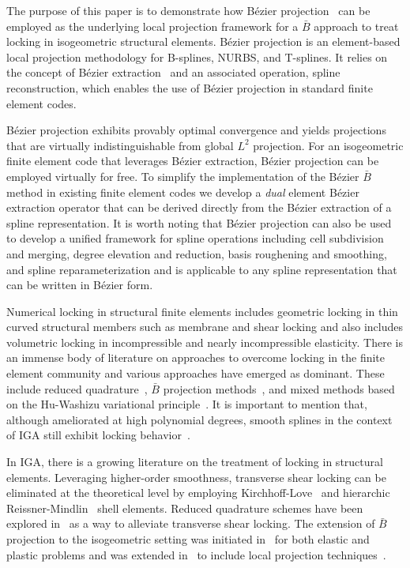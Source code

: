 \documentclass{article}
\newcommand{\Bezier}{{B\'{e}zier} }
\begin{document}
The purpose of this paper is to demonstrate how B\'{e}zier projection~\cite{thomas_bezier_2015} can be employed as the underlying local projection framework for a $\bar{B}$ approach to treat locking in isogeometric structural elements. B\'ezier projection is an element-based local projection methodology for B-splines, NURBS, and T-splines. It relies on the concept of B\'ezier extraction~\cite{borden_isogeometric_2011, scott_isogeometric_2011} and an associated operation, spline reconstruction, which enables the use of B\'ezier projection in standard finite element codes.

B\'ezier projection exhibits provably optimal convergence and yields
projections that are virtually indistinguishable from global $L^2$ projection. For an isogeometric finite element code that leverages B\'ezier extraction, B\'ezier projection can be employed virtually for free. To simplify the implementation of the \Bezier $\bar{B}$ method in existing finite element codes we develop a \textit{dual} element \Bezier extraction operator that can be derived directly from the \Bezier extraction of a spline representation. It is worth noting that B\'ezier projection can also be used to develop a unified framework for spline operations including cell subdivision and merging, degree elevation and reduction, basis roughening and smoothing, and spline reparameterization and is applicable to any spline representation that can be written in B\'ezier form.

Numerical locking in structural finite elements includes geometric locking in thin curved structural members such as membrane and shear locking and also includes volumetric locking in incompressible and nearly incompressible elasticity. There is an immense body of literature on approaches to overcome locking in the finite element community and various approaches have emerged as dominant. These include reduced quadrature~\cite{malkus_mixed_1978,zienkiewicz_reduced_1971}, $\bar{B}$ projection methods~\cite{nagtegaal_numerically_1974,hughes_generalization_1980}, and mixed methods based on the Hu-Washizu variational principle~\cite{dolbow_volumetric_1999,kasper_mixed-enhanced_2000,hughes_variational_1986}. It is important to mention that, although ameliorated at high polynomial degrees, smooth splines in the context of IGA still exhibit locking behavior~\cite{echter_numerical_2010, bouclier_locking_2012}.

In IGA, there is a growing literature on the treatment of locking in structural elements. Leveraging higher-order smoothness, transverse shear locking can be eliminated at the theoretical level by employing Kirchhoff-Love~\cite{kiendl_isogeometric_2009, kiendl_isogeometric_2015} and hierarchic Reissner-Mindlin~\cite{oesterle_hierarchic_2017, oesterle_shear_2016,echter_hierarchic_2013} shell elements. Reduced quadrature schemes have been explored in~\cite{adam_improved_2014, adam_improved_2015, adam_selective_2015} as a way to alleviate transverse shear locking. The extension of $\bar{B}$ projection to the isogeometric setting was initiated in~\cite{elguedj:hal-00457010} for both elastic and plastic problems and was extended in~\cite{bouclier_efficient_2013} to include local projection techniques~\cite{mitchell_method_2011,govindjee_convergence_2012}.
\end{document}
